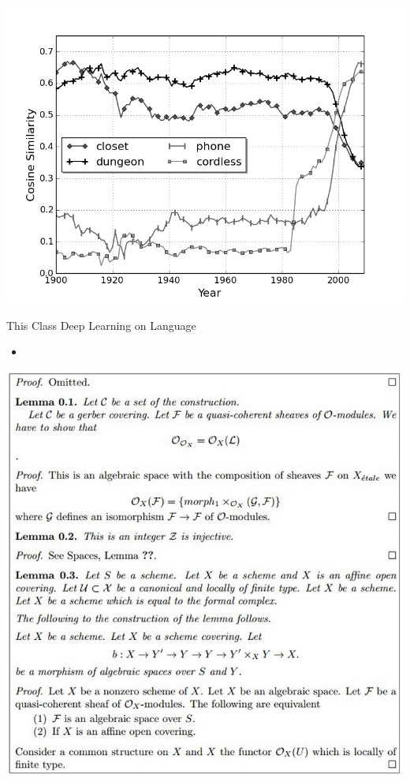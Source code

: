 \documentclass{beamer}
\begin{document}
\begin{frame}
  \includegraphics[width=\textwidth]{cell}
\end{frame}
\begin{frame}{This Class}
  Deep Learning on Language 

  \begin{itemize}
  \item 
  \end{itemize}
  
\end{frame}

\begin{frame}

\includegraphics[width=\textwidth]{../latex3}
\end{frame}
\end{document}
